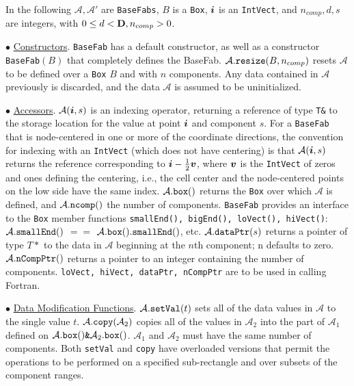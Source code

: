 In the following ${\mathcal{A}}, 
{\mathcal{A}}'$ are {\tt{BaseFabs}}, $B$ is a {\tt{Box}}, ${\boldsymbol{i}}$ is
an {\tt IntVect}, and $n_{comp},
d, s$ are integers, with $0 \leq d < {\mathbf{D}}, n_{comp} > 0$.
\begin{trivlist}

\item $\bullet$ \underline{Constructors}.  {\tt{BaseFab}} 
has a default constructor, as well
as a constructor {\tt{BaseFab}}$(B)$ that completely defines the
BaseFab.  ${\mathcal{A}}.{\tt{resize}}(B, n_{comp})$ 
resets ${\mathcal{A}}$ to be defined over a
{\tt{Box}} $B$ and with $n$ components.  Any data contained in ${\mathcal{A}}$
previously is discarded, and the data ${\mathcal{A}}$ is assumed to be
uninitialized.

\item $\bullet$ \underline{Accessors}.
$\mathcal{A}({\boldsymbol{i}},s)$ is an indexing operator, returning a reference
of type {\tt T\&} to the storage location for the value at point
${\boldsymbol{i}}$ and component $s$. For a {\tt BaseFab} that is node-centered in
one or more of the coordinate directions, the convention for indexing
with an {\tt IntVect} (which does not have centering) is that 
$\mathcal{A}({\boldsymbol{i}},s)$ returns the reference corresponding to 
${\boldsymbol{i}} - \frac{1}{2} {\boldsymbol{v}}$, where ${\boldsymbol{v}}$ is the {\tt IntVect} of zeros
and ones defining the centering, i.e., the cell center and the
node-centered points on the low side have the same index.
${\mathcal{A}}.{\tt{box}}()$ 
returns the {\tt{Box}} over which ${\mathcal{A}}$ is defined, and
${\mathcal{A}}.{\tt{ncomp}}()$ the number of components.
{\tt{BaseFab}} provides
an interface to the {\tt{Box}} member functions {\tt{smallEnd(),
bigEnd(), loVect(), hiVect()}}:  ${\mathcal{A}}.{\tt{smallEnd}}()$ 
$==$ ${\mathcal{A}}.{\tt{box().smallEnd()}}$, etc.  
${\mathcal{A}}.{\tt{dataPtr}}(s)$ returns a
pointer of type $T*$ to the data in ${\mathcal{A}}$ 
beginning at the $n$th component;
n defaults to zero.  ${\mathcal{A}}.{\tt{nCompPtr}}()$ 
returns a pointer to an
integer containing the number of components.  {\tt{loVect, hiVect,
dataPtr, nCompPtr}} are to be used in calling Fortran.
\item $\bullet$ \underline{Data Modification Functions}.  
${\mathcal{A}}.{\tt{setVal}}(t)$ sets all of
the data values in ${\mathcal{A}}$ to the single 
value $t$.  ${\mathcal{A}}.{\tt{copy}}({\mathcal{A}}_2)$
copies all of the values in ${\mathcal{A}}_2$ 
into the part of ${\mathcal{A}}_1$ defined on
${\mathcal{A}}.{\tt{box}}() \mbox{\tt{\&}} {\mathcal{A}}_2.{\tt{box}}()$.
${\mathcal{A}}_1$ and ${\mathcal{A}}_2$ must have the
same number of components.  Both {\tt{setVal}} and {\tt{copy}} have
overloaded versions that permit the operations to be performed on a
specified sub-rectangle and over subsets of the component ranges.


\end{trivlist}
